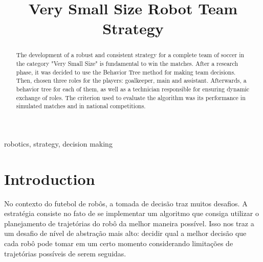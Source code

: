 \documentclass[conference]{IEEEtran}
\begin{document}
\title{Very Small Size Robot Team Strategy\\
}

\author{
\and
{}
\and
{}
}

\maketitle


\begin{abstract}
The development of a robust and consistent strategy for a complete team of soccer in the category "Very Small Size" is fundamental to win the matches. After a research phase, it was decided to use the Behavior Tree method for making team decisions. Then, chosen three roles for the players: goalkeeper, main and assistant. Afterwards, a behavior tree for each of them, as well as a technician responsible for ensuring dynamic exchange of roles. The criterion used to evaluate the algorithm was its performance in simulated matches and in national competitions.
\end{abstract}

\begin{IEEEkeywords}
robotics, strategy, decision making
\end{IEEEkeywords}

\section{Introduction}

	No contexto do futebol de robôs, a tomada de decisão traz muitos desafios. A estratégia consiste no fato de se implementar um algoritmo que consiga utilizar o planejamento de trajetórias do robô da melhor maneira possível. Isso nos traz a um desafio de nível de abstração mais alto: decidir qual a melhor decisão que cada robô pode tomar em um certo momento considerando limitações de trajetórias possíveis de serem seguidas.
\end{document}
